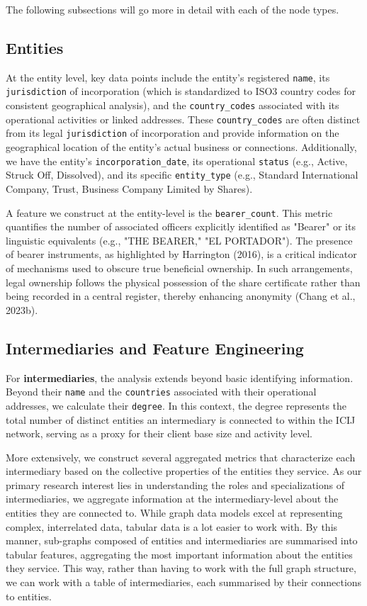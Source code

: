 The following subsections will go more in detail with each of the node types.

\subsection{Entities}

At the entity level, key data points include the entity's registered \texttt{name}, its \texttt{jurisdiction} of incorporation (which is standardized to ISO3 country codes for consistent geographical analysis), and the \texttt{country\_codes} associated with its operational activities or linked addresses. These \texttt{country\_codes} are often distinct from its legal \texttt{jurisdiction} of incorporation and provide information on the geographical location of the entity's actual business or connections. Additionally, we have the entity's \texttt{incorporation\_date}, its operational \texttt{status} (e.g., Active, Struck Off, Dissolved), and its specific \texttt{entity\_type} (e.g., Standard International Company, Trust, Business Company Limited by Shares).

A feature we construct at the entity-level is the \texttt{bearer\_count}. This metric quantifies the number of associated officers explicitly identified as "Bearer" or its linguistic equivalents (e.g., "THE BEARER," "EL PORTADOR"). The presence of bearer instruments, as highlighted by Harrington (2016), is a critical indicator of mechanisms used to obscure true beneficial ownership. In such arrangements, legal ownership follows the physical possession of the share certificate rather than being recorded in a central register, thereby enhancing anonymity (Chang et al., 2023b).

\subsection{Intermediaries and Feature Engineering}

For \textbf{intermediaries}, the analysis extends beyond basic identifying information. Beyond their \texttt{name} and the \texttt{countries} associated with their operational addresses, we calculate their \texttt{degree}. In this context, the degree represents the total number of distinct entities an intermediary is connected to within the ICIJ network, serving as a proxy for their client base size and activity level.

More extensively, we construct several aggregated metrics that characterize each intermediary based on the collective properties of the entities they service. As our primary research interest lies in understanding the roles and specializations of intermediaries, we aggregate information at the intermediary-level about the entities they are connected to. While graph data models excel at representing complex, interrelated data, tabular data is a lot easier to work with. By this manner, sub-graphs composed of entities and intermediaries are summarised into tabular features, aggregating the most important information about the entities they service. This way, rather than having to work with the full graph structure, we can work with a table of intermediaries, each summarised by their connections to entities. 

